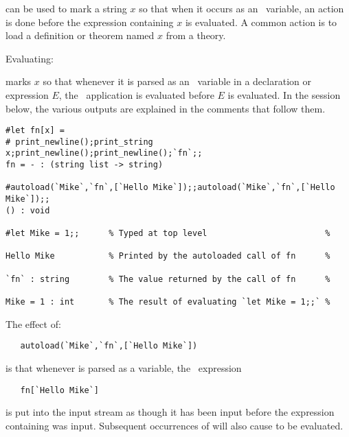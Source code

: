 \noindent can be used to mark a string $x$ so that when it occurs as an \ML\
variable, an action is done before the expression containing $x$ is evaluated.
A common action is to load a definition or theorem named $x$ from a theory.

Evaluating:

\bigskip

{\small
\noindent{}
}

\bigskip

\noindent marks $x$ so that whenever it is parsed as an \ML\ variable in a
declaration or expression $E$, the \ML\ application 
 is evaluated before $E$ is evaluated. 
In the session below, the various
outputs are explained in the comments that follow them.

\setcounter{sessioncount}{1}
\begin{session}\begin{verbatim}
#let fn[x] =
# print_newline();print_string x;print_newline();print_newline();`fn`;;
fn = - : (string list -> string)

#autoload(`Mike`,`fn`,[`Hello Mike`]);;autoload(`Mike`,`fn`,[`Hello Mike`]);;
() : void

#let Mike = 1;;      % Typed at top level                        %

Hello Mike           % Printed by the autoloaded call of fn      %

`fn` : string        % The value returned by the call of fn      %

Mike = 1 : int       % The result of evaluating `let Mike = 1;;` %
\end{verbatim}\end{session}

\noindent The effect of:

\begin{verbatim}
   autoload(`Mike`,`fn`,[`Hello Mike`])
\end{verbatim}

\noindent is that whenever  is parsed as a variable, the \ML\ 
expression

\begin{hol}\begin{verbatim}
   fn[`Hello Mike`]
\end{verbatim}\end{hol}

\noindent is put into the input stream as though it has been input before the
expression containing  was input.  Subsequent occurrences of 
will also cause \ml{fn[`Hello Mike`]} to be evaluated.

